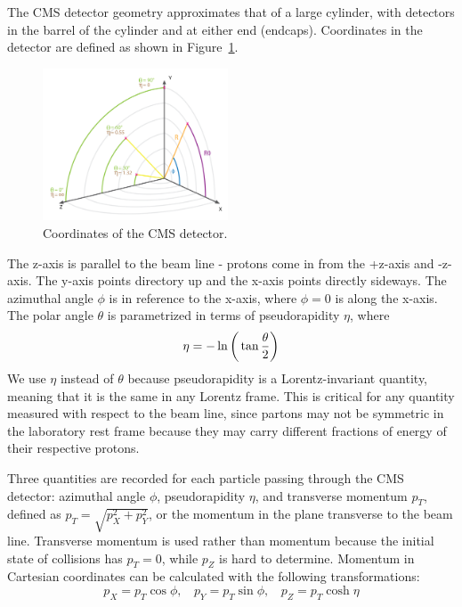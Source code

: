 The CMS detector geometry approximates that of a large cylinder, with detectors in the barrel of the cylinder and at either end (endcaps). Coordinates in the detector are defined as shown in Figure~\ref{Fig:CMS:coordinates}. 
\begin{figure}[h!]
    \centering
    \includegraphics[width=0.49\textwidth]{F3/img_cms_coordinates.png}
    \caption{Coordinates of the CMS detector.}
    \label{Fig:CMS:coordinates}
\end{figure} 
The z-axis is parallel to the beam line - protons come in from the +z-axis and -z-axis. The y-axis points directory up and the x-axis points directly sideways. The azimuthal angle $\phi$ is in reference to the x-axis, where $\phi=0$ is along the x-axis. The polar angle $\theta$ is parametrized in terms of pseudorapidity $\eta$, where 
\begin{equation}
    \eta = -\ln\bigg{(}\tan\frac{\theta}{2}\bigg{)}
\end{equation}
We use $\eta$ instead of $\theta$ because pseudorapidity is a Lorentz-invariant quantity, meaning that it is the same in any Lorentz frame. This is critical for any quantity measured with respect to the beam line, since partons may not be symmetric in the laboratory rest frame because they may carry different fractions of energy of their respective protons.

Three quantities are recorded for each particle passing through the CMS detector: azimuthal angle $\phi$, pseudorapidity $\eta$, and transverse momentum $p_{T}$, defined as $p_{T} = \sqrt{p_{X}^{2}+p_{Y}^{2}}$, or the momentum in the plane transverse to the beam line. Transverse momentum is used rather than momentum because the initial state of collisions has $p_{T}=0$, while $p_{Z}$ is hard to determine. Momentum in Cartesian coordinates can be calculated with the following transformations:
\begin{equation}
p_X = p_T\cos\phi, \ \ \ \ 
p_Y = p_T\sin\phi, \ \ \ \
p_Z = p_T\cosh\eta
\end{equation}
\vspace{5mm}

